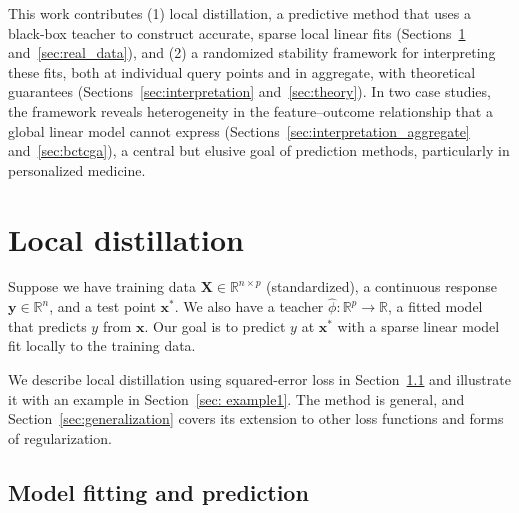 \documentclass[12pt]{article}
\theoremstyle{definition}
\begin{document}
This work contributes (1) local distillation, a predictive method that uses a black-box teacher to construct accurate, sparse local linear fits (Sections~\ref{sec:methods} and~\ref{sec:real_data}),  and (2) a randomized stability framework for interpreting these fits, both at individual query points and in aggregate, with theoretical guarantees (Sections~\ref{sec:interpretation} and~\ref{sec:theory}). In two case studies, the framework reveals heterogeneity in the feature--outcome relationship that a global linear model cannot express (Sections~\ref{sec:interpretation_aggregate} and~\ref{sec:bctcga}), a central but elusive goal of prediction methods, particularly in personalized medicine.



\section{Local distillation}
\label{sec:methods}

Suppose we have training data $\bm{X}\in \mathbb{R}^{n\times p}$ (standardized), a continuous response $\bm{y} \in \mathbb{R}^n$, and a test point $\bm{x}^*$.
We also have a teacher $\hat\phi:\mathbb{R}^p \to \mathbb{R}$, a fitted model that predicts $y$ from $\bm{x}$.
Our goal is to predict $y$ at $\bm{x}^*$ with a sparse linear model fit locally to the training data.

We describe local distillation using squared-error loss in Section~\ref{sec: localdistillation} and illustrate it with an example in Section~\ref{sec: example1}.
The method is general, and Section~\ref{sec:generalization} covers its extension to other loss functions and forms of regularization.

\subsection{Model fitting and prediction}
\label{sec: localdistillation}
\end{document}
